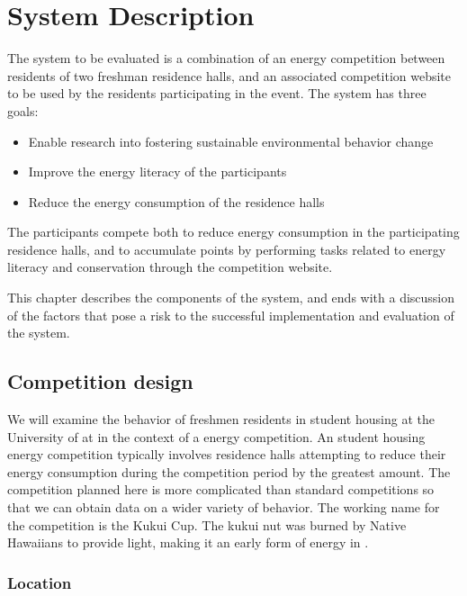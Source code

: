 \chapter{System Description}
\label{cha:system-description}

The system to be evaluated is a combination of an energy competition between residents of two freshman residence halls, and an associated competition website to be used by the residents participating in the event. The system has three goals:

\begin{itemize}
	\item Enable research into fostering sustainable environmental behavior change
	\item Improve the energy literacy of the participants
	\item Reduce the energy consumption of the residence halls
\end{itemize}

The participants compete both to reduce energy consumption in the participating residence halls, and to accumulate points by performing tasks related to energy literacy and conservation through the competition website.

This chapter describes the components of the system, and ends with a discussion of the factors that pose a risk to the successful implementation and evaluation of the system.

\section{Competition design}

We will examine the behavior of freshmen residents in student housing at the University of \Hawaii at \Manoa in the context of a energy competition. An student housing energy competition typically involves residence halls attempting to reduce their energy consumption during the competition period by the greatest amount. The competition planned here is more complicated than standard competitions so that we can obtain data on a wider variety of behavior. The working name for the competition is the Kukui Cup. The kukui nut was burned by Native Hawaiians to provide light, making it an early form of energy in \Hawaii.

\subsection{Location}

